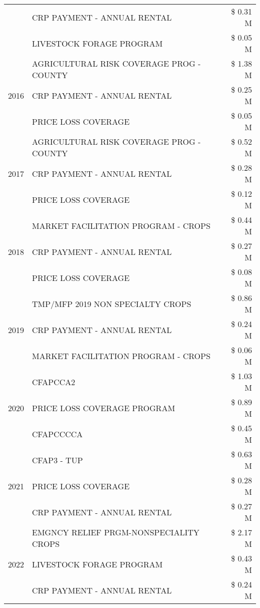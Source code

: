 \begin{tabular}{llr}
 & CRP PAYMENT - ANNUAL RENTAL & \$ 0.31 M \\
 & LIVESTOCK FORAGE PROGRAM & \$ 0.05 M \\
\cline{1-3}
\multirow[t]{3}{*}{2016} & AGRICULTURAL RISK COVERAGE PROG - COUNTY & \$ 1.38 M \\
 & CRP PAYMENT - ANNUAL RENTAL & \$ 0.25 M \\
 & PRICE LOSS COVERAGE & \$ 0.05 M \\
\cline{1-3}
\multirow[t]{3}{*}{2017} & AGRICULTURAL RISK COVERAGE PROG - COUNTY & \$ 0.52 M \\
 & CRP PAYMENT - ANNUAL RENTAL & \$ 0.28 M \\
 & PRICE LOSS COVERAGE & \$ 0.12 M \\
\cline{1-3}
\multirow[t]{3}{*}{2018} & MARKET FACILITATION PROGRAM - CROPS & \$ 0.44 M \\
 & CRP PAYMENT - ANNUAL RENTAL & \$ 0.27 M \\
 & PRICE LOSS COVERAGE & \$ 0.08 M \\
\cline{1-3}
\multirow[t]{3}{*}{2019} & TMP/MFP 2019 NON SPECIALTY CROPS & \$ 0.86 M \\
 & CRP PAYMENT - ANNUAL RENTAL & \$ 0.24 M \\
 & MARKET FACILITATION PROGRAM - CROPS & \$ 0.06 M \\
\cline{1-3}
\multirow[t]{3}{*}{2020} & CFAPCCA2 & \$ 1.03 M \\
 & PRICE LOSS COVERAGE PROGRAM & \$ 0.89 M \\
 & CFAPCCCCA & \$ 0.45 M \\
\cline{1-3}
\multirow[t]{3}{*}{2021} & CFAP3 - TUP & \$ 0.63 M \\
 & PRICE LOSS COVERAGE & \$ 0.28 M \\
 & CRP PAYMENT - ANNUAL RENTAL & \$ 0.27 M \\
\cline{1-3}
\multirow[t]{3}{*}{2022} & EMGNCY RELIEF PRGM-NONSPECIALITY CROPS & \$ 2.17 M \\
 & LIVESTOCK FORAGE PROGRAM & \$ 0.43 M \\
 & CRP PAYMENT - ANNUAL RENTAL & \$ 0.24 M \\
\cline{1-3}
\bottomrule
\end{tabular}
